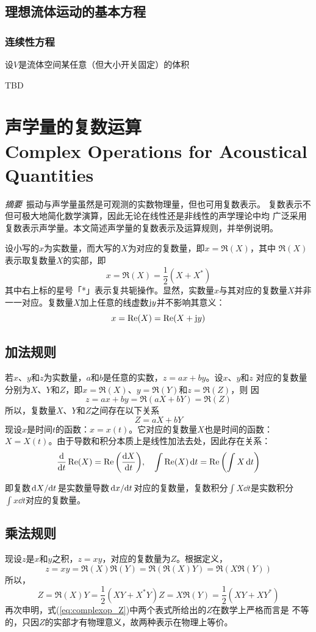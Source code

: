 \documentclass[UTF8]{ctexbook}
\let\stdsection\section
\renewcommand\section{\newpage\stdsection}
\begin{document}
\subsection{理想流体运动的基本方程}
\subsubsection{连续性方程}
设$V$是流体空间某任意（但大小开关固定）的体积

TBD

\section{声学量的复数运算\\
Complex Operations for Acoustical Quantities}

\emph{摘要}\ 振动与声学量虽然是可观测的实数物理量，但也可用复数表示。
复数表示不但可极大地简化数学演算，因此无论在线性还是非线性的声学理论中均
广泛采用复数表示声学量。本文简述声学量的复数表示及运算规则，并举例说明。

设小写的$x$为实数量，而大写的$X$为对应的复数量，即$x=\Re(X)$，其中
$\Re(X)$表示取复数量$X$的实部，即
$$
x = \Re(X) = \frac12(X+X^*)
$$
其中右上标的星号「*」表示复共轭操作。显然，实数量$x$与其对应的复数量$X$并非
一一对应。复数量$X$加上任意的线虚数$\mathrm{j} y$并不影响其意义：
$$
x = \Re(X) = \Re(X+\mathrm{j} y)
$$

\subsection{加法规则}
若$x$、$y$和$z$为实数量，$a$和$b$是任意的实数，$z=ax+by$。设$x$、$y$和$z$
对应的复数量分别为$X$、$Y$和$Z$，即$x=\Re(X)$、$y=\Re(Y)$和$z=\Re(Z)$，则
因
$$
z = ax+by = \Re(aX+bY) = \Re(Z)
$$
所以，复数量$X$、$Y$和$Z$之间存在以下关系
$$Z=aX+bY$$
现设$x$是时间$t$的函数：$x=x(t)$。它对应的复数量$X$也是时间的函数：$X=
X(t)$。由于导数和积分本质上是线性加法去处，因此存在关系：
$$\dv{t} \Re(X) =\Re\qty(\dv{X}{t})\qc \int \Re(X) \dd{t} = \Re 
\qty(\int X\dd{t})$$

即复数$\dv*{X}{t}$是实数量导数$\dv*{x}{t}$对应的复数量，复数积分$\int X
\dd{t}$是实数积分$\int x\dd{t}$对应的复数量。

\subsection{乘法规则}
现设$z$是$x$和$y$之积，$z=xy$，对应的复数量为$Z$。根据定义，
$$z=xy =\Re(X)\Re(Y) = \Re(\Re(X)Y)=\Re(X\Re(Y))$$
所以，
\begin{subequations}
	\label{eq:complexop_Z}
	\begin{equation}Z= \Re(X)Y = \frac12 (XY+X^*Y)\end{equation}
	\begin{equation}Z=X\Re(Y) = \frac12 (XY+XY^*)\end{equation}
\end{subequations}
再次申明，式(\ref{eq:complexop_Z})中两个表式所给出的$Z$在数学上严格而言是
不等的，只因$Z$的实部才有物理意义，故两种表示在物理上等价。
\end{document}
